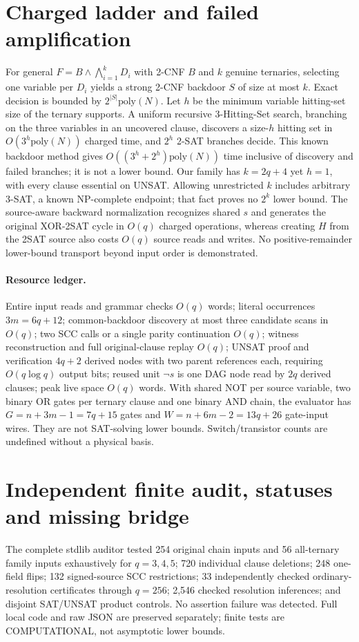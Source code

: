 \documentclass[11pt]{article}
\begin{document}
\section{Charged ladder and failed amplification}
For general $F=B\wedge\bigwedge_{i=1}^kD_i$ with 2-CNF $B$ and $k$ genuine ternaries, selecting one variable per $D_i$ yields a strong 2-CNF backdoor $S$ of size at most $k$. Exact decision is bounded by $2^{|S|}\mathrm{poly}(N)$. Let $h$ be the minimum variable hitting-set size of the ternary supports. A uniform recursive 3-Hitting-Set search, branching on the three variables in an uncovered clause, discovers a size-$h$ hitting set in $O(3^h\mathrm{poly}(N))$ charged time, and $2^h$ 2-SAT branches decide. This known backdoor method gives $O((3^h+2^h)\mathrm{poly}(N))$ time inclusive of discovery and failed branches; it is not a lower bound. Our family has $k=2q+4$ yet $h=1$, with every clause essential on UNSAT. Allowing unrestricted $k$ includes arbitrary 3-SAT, a known NP-complete endpoint; that fact proves no $2^k$ lower bound. The source-aware backward normalization recognizes shared $s$ and generates the original XOR-2SAT cycle in $O(q)$ charged operations, whereas creating $H$ from the 2SAT source also costs $O(q)$ source reads and writes. No positive-remainder lower-bound transport beyond input order is demonstrated.

\paragraph{Resource ledger.} Entire input reads and grammar checks $O(q)$ words; literal occurrences $3m=6q+12$; common-backdoor discovery at most three candidate scans in $O(q)$; two SCC calls or a single parity continuation $O(q)$; witness reconstruction and full original-clause replay $O(q)$; UN\-SAT proof and verification $4q+2$ derived nodes with two parent references each, requiring $O(q\log q)$ output bits; reused unit $\neg s$ is one DAG node read by $2q$ derived clauses; peak live space $O(q)$ words. With shared NOT per source variable, two binary OR gates per ternary clause and one binary AND chain, the evaluator has $G=n+3m-1=7q+15$ gates and $W=n+6m-2=13q+26$ gate-input wires. They are not SAT-solving lower bounds. Switch/transistor counts are undefined without a physical basis.

\section{Independent finite audit, statuses and missing bridge}
The complete stdlib auditor tested 254 original chain inputs and 56 all-ternary family inputs exhaustively for $q=3,4,5$; 720 individual clause deletions; 248 one-field flips; 132 signed-source SCC restrictions; 33 independently checked ordinary-resolution certificates through $q=256$; 2,546 checked resolution inferences; and disjoint SAT/UNSAT product controls. No assertion failure was detected. Full local code and raw JSON are preserved separately; finite tests are COMPUTATIONAL, not asymptotic lower bounds.
\end{document}

